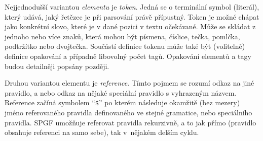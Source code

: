 \begin{center}
\end{center}

Nejjednodušší variantou \emph{elementu} je \emph{token}.
Jedná se o terminální symbol (literál), který udává, jaký řetězec je při parsování právě přípustný.
Token je možné chápat jako konkrétní slovo, které je v dané pozici v textu očekávané.
Může se skládat z jednoho nebo více znaků, která mohou být písmena, číslice, tečka, pomlčka, podtržítko nebo dvojtečka.
Součástí definice tokenu může také být (volitelně) definice opakování a případně libovolný počet tagů.
Opakování elementů a tagy budou detailněji popsány později.

Druhou variantou elementu je \emph{reference}.
Tímto pojmem se rozumí odkaz na jiné pravidlo, a nebo odkaz na nějaké speciální pravidlo s vyhrazeným názvem.
Reference začíná symbolem \enquote{\texttt{\$}} po kterém následuje okamžitě (bez mezery) jméno referovaného
pravidla definovaného ve stejné gramatice, nebo speciálního pravidla.
SPGF umožňuje referovat pravidla rekurzivně, a to jak přímo (pravidlo obsahuje referenci na samo sebe), tak v~nějakém delším cyklu.

